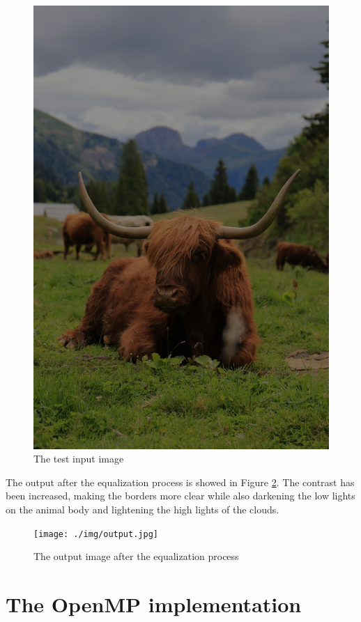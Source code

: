 \documentclass[10pt,twocolumn,letterpaper]{article}
\begin{document}
\begin{figure}[!ht]
    \centering 
    \includegraphics[width=0.8\linewidth]{../assets/pic_low_contrast.jpg}
    \caption{The test input image}
    \label{fig:input}
\end{figure}

The output after the equalization process is showed in Figure \ref{fig:output}.
The contrast has been increased, making the borders more clear while also darkening
the low lights on the animal body and lightening the high lights of the clouds.

\begin{figure}[!ht]
    \centering 
    \texttt{[image: ./img/output.jpg]}
    \caption{The output image after the equalization process}
    \label{fig:output}
\end{figure}

\section{The OpenMP implementation}
\end{document}
